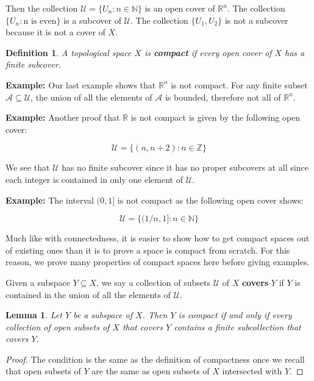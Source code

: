 \documentclass[a4paper]{article}
\newtheorem{lemma}[theorem]{Lemma}
\newtheorem{definition}[theorem]{Definition}
\numberwithin{theorem}{section}
\begin{document}
Then the collection $\mathcal{U} = \{U_n : n \in \mathbb{N} \}$ is an open cover of $\mathbb{R}^n$. The collection $\{U_n : \text{n is even}\}$ is a subcover of $\mathcal{U}$. The collection $\{U_1,U_2\}$ is not a subcover because it is not a cover of $X$.

\begin{definition}
A topological space $X$ is \textbf{compact} if every open cover of $X$ has a finite subcover.
\end{definition}

\textbf{Example:} Our last example shows that $\mathbb{R}^n$ is not compact. For any finite subset $\mathcal{A} \subseteq \mathcal{U}$, the union of all the elements of $\mathcal{A}$ is bounded, therefore not all of $\mathbb{R}^n$.

\textbf{Example:} Another proof that $\mathbb{R}$ is not compact is given by the following open cover:

$$ \mathcal{U} = \{(n, n+2) : n \in \mathbb{Z} \} $$

We see that $\mathcal{U}$ has no finite subcover since it has no proper subcovers at all since each integer is contained in only one element of $\mathcal{U}$.

\textbf{Example:} The interval $(0,1]$ is not compact as the following open cover shows:

$$  \mathcal{U} = \{(1/n, 1] : n \in \mathbb{N} \}  $$

Much like with connectedness, it is easier to show how to get compact spaces out of existing ones than it is to prove a space is compact from scratch. For this reason, we prove many properties of compact spaces here before giving examples.

Given a subspace $Y \subseteq X$, we say a collection of subsets $\mathcal{U}$ of $X$ \textbf{covers} $Y$ if $Y$ is contained in the union of all the elements of $\mathcal{U}$.

\begin{lemma}
Let $Y$ be a subspace of $X$. Then $Y$ is compact if and only if every collection of open subsets of $X$ that covers $Y$ contains a finite subcollection that covers $Y$.
\end{lemma}

\begin{proof}
The condition is the same as the definition of compactness once we recall that open subsets of $Y$ are the same as open subsets of $X$ intersected with $Y$.
\end{proof}
\end{document}
